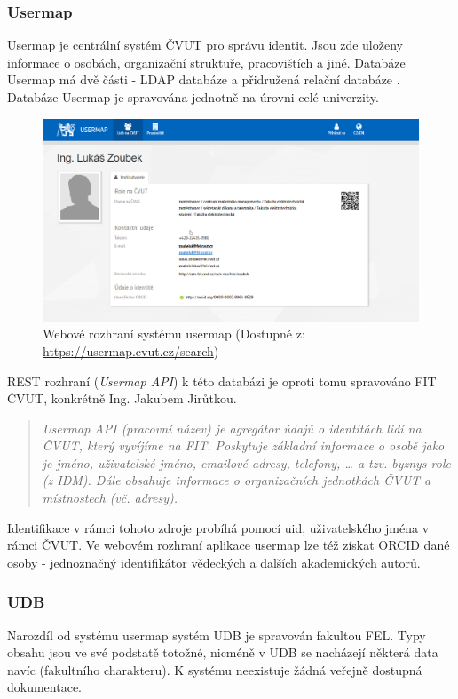 \subsubsection{Usermap}
Usermap je centrální systém ČVUT pro správu identit. Jsou zde uloženy informace o osobách, organizační struktuře, pracovištích a jiné. Databáze Usermap má dvě části - LDAP databáze a přidružená relační databáze \cite{usermap-db}. Databáze Usermap je spravována jednotně na úrovni celé univerzity.\par
\begin{figure}[htbp!]
	\includegraphics[width=\linewidth]{img/usermap.png}
	\caption{Webové rozhraní systému usermap (Dostupné z:  \url{https://usermap.cvut.cz/search})}
	\label{fig:usermap}
\end{figure}
\noindent REST rozhraní (\textit{Usermap API}) k této databázi je oproti tomu spravováno FIT ČVUT, konkrétně Ing. Jakubem Jirůtkou.
\begin{quote}
 \textit{Usermap API (pracovní název) je agregátor údajů o identitách lidí na ČVUT, který vyvíjíme na FIT. Poskytuje základní informace o osobě jako je jméno, uživatelské jméno, emailové adresy, telefony, … a tzv. byznys role (z IDM). Dále obsahuje informace o organizačních jednotkách ČVUT a místnostech (vč. adresy).} \cite{usermap-api}
\end{quote}
Identifikace v rámci tohoto zdroje probíhá pomocí uid, uživatelského jména v rámci ČVUT. Ve webovém rozhraní aplikace usermap lze též získat ORCID dané osoby - jednoznačný identifikátor vědeckých a dalších akademických autorů\cite{orcid}.
\subsubsection{UDB}
Narozdíl od systému usermap systém UDB je spravován fakultou FEL. Typy obsahu jsou ve své podstatě totožné, nicméně v UDB se nacházejí některá data navíc (fakultního charakteru). K systému neexistuje žádná veřejně dostupná dokumentace.
